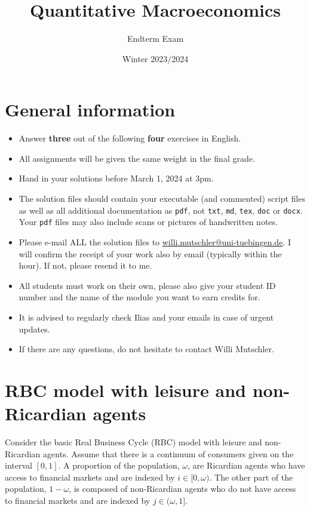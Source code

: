\documentclass{article}
\begin{document}
	
\title{Quantitative Macroeconomics}
\author{Endterm Exam}
\date{Winter 2023/2024}
\maketitle

\section*{General information}
\begin{itemize}
	\item Answer \textbf{three} out of the following \textbf{four} exercises in English.
	\item All assignments will be given the same weight in the final grade.
	\item Hand in your solutions before March 1, 2024 at 3pm.
	\item The solution files should contain your executable (and commented) script files
		as well as all additional documentation as \texttt{pdf}, not \texttt{txt}, \texttt{md}, \texttt{tex}, \texttt{doc} or \texttt{docx}.
	Your \texttt{pdf} files may also include scans or pictures of handwritten notes.
	\item Please e-mail ALL the solution files to \url{willi.mutschler@uni-tuebingen.de}.
	I will confirm the receipt of your work also by email (typically within the hour). If not, please resend it to me.
	\item All students must work on their own, please also give your student ID number and the name of the module you want to earn credits for.
	\item It is advised to regularly check Ilias and your emails in case of urgent updates.
	\item If there are any questions, do not hesitate to contact Willi Mutschler.
\end{itemize}

\newpage

\section{RBC model with leisure and non-Ricardian agents}
Consider the basic Real Business Cycle (RBC) model with leisure and non-Ricardian agents. Assume that there is a continuum of consumers given on the interval $[0,1]$. A proportion of the population, $\omega$, are Ricardian agents who have access to financial markets and are indexed by $i \in [0,\omega)$. The other part of the population, $1-\omega$, is composed of non-Ricardian agents who do not have access to financial markets and are indexed by $j \in (\omega,1]$.
\end{document}
